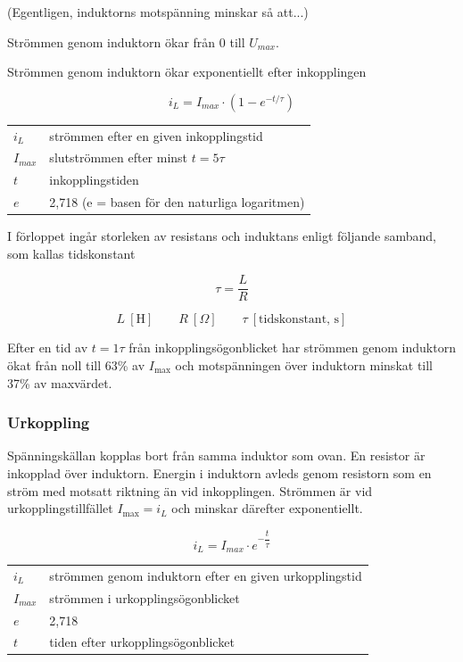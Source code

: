 (Egentligen, induktorns motspänning minskar så att...)

Strömmen genom induktorn ökar från 0 till \(U_{max}\).

Strömmen genom induktorn ökar exponentiellt efter inkopplingen

\[ i_L = I_{max} \cdot (1-e^{-t/\tau} )\]

\begin{tabular}{lp{}}
  \(i_L\) &  strömmen efter en given inkopplingstid \\
  \(I_{max}\) & slutströmmen efter minst \(t = 5\tau\) \\
  \(t\) & inkopplingstiden \\
  \(e\) & 2,718 (e = basen för den naturliga logaritmen) \\
\end{tabular}

I förloppet ingår storleken av resistans och induktans enligt följande samband,
som kallas tidskonstant

\[ \tau = \frac{L}{R} \]

\[
L\ [\text{H}] \qquad
R\ [\Omega] \qquad
\tau\ [\text{tidskonstant, s}]
\]

Efter en tid av \(t = 1\tau\) från inkopplingsögonblicket har strömmen genom
induktorn ökat från noll till 63\% av \(I_{\text{max}}\) och motspänningen över
induktorn minskat till 37\% av maxvärdet.

\subsubsection{Urkoppling}

Spänningskällan kopplas bort från samma induktor som ovan.
En resistor är inkopplad över induktorn.
Energin i induktorn avleds genom resistorn som en ström med motsatt riktning
än vid inkopplingen.
Strömmen är vid urkopplingstillfället \(I_\text{{max}} = i_L\) och minskar 
därefter
exponentiellt.

\[i_L = I_{max} \cdot e^{-\dfrac{t}{\tau}}\]

\begin{tabular}{ll}
  \(i_L\) & strömmen genom induktorn efter en given urkopplingstid \\
  \(I_{max}\) & strömmen i urkopplingsögonblicket \\
  \(e\) & 2,718 \\
  \(t\) & tiden efter urkopplingsögonblicket \\
\end{tabular}

